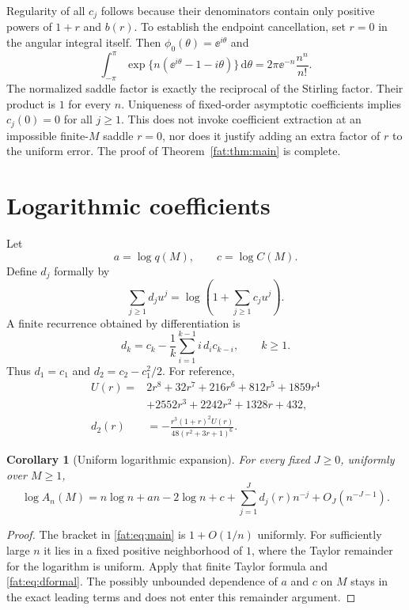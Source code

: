 \documentclass[11pt,letterpaper]{article}
\numberwithin{equation}{section}
\newtheorem{corollary}[theorem]{Corollary}
\theoremstyle{remark}\newtheorem{remark}[theorem]{Remark}
\newcommand{\dd}{\,\mathrm d}\newcommand{\TV}{d_{\mathrm{TV}}}\newcommand{\Pois}{\operatorname{Pois}}
\begin{document}
Regularity of all $c_j$ follows because their denominators contain only positive powers of $1+r$ and $b(r)$. To establish the endpoint cancellation, set $r=0$ in the angular integral itself. Then $\phi_0(\theta)=\ee^{i\theta}$ and
\[
 \int_{-\pi}^{\pi}\exp\{n(\ee^{i\theta}-1-i\theta)\}\dd\theta
 =2\pi\ee^{-n}\frac{n^n}{n!}.
\]
The normalized saddle factor is exactly the reciprocal of the Stirling factor. Their product is $1$ for every $n$. Uniqueness of fixed-order asymptotic coefficients implies $c_j(0)=0$ for all $j\ge1$. This does not invoke coefficient extraction at an impossible finite-$M$ saddle $r=0$, nor does it justify adding an extra factor of $r$ to the uniform error. The proof of Theorem~\ref{fat:thm:main} is complete.

\section{Logarithmic coefficients}\label{fat:sec:log}
Let
\[
 a=\log q(M),\qquad c=\log C(M).
\]
Define $d_j$ formally by
\begin{equation}\label{fat:eq:dformal}
 \sum_{j\ge1}d_ju^j=\log\left(1+\sum_{j\ge1}c_ju^j\right).
\end{equation}
A finite recurrence obtained by differentiation is
\begin{equation}\label{fat:eq:drecursion}
 d_k=c_k-\frac1k\sum_{i=1}^{k-1}i\,d_i c_{k-i},\qquad k\ge1.
\end{equation}
Thus $d_1=c_1$ and $d_2=c_2-c_1^2/2$. For reference,
\begin{align*}
 U(r)={}&2r^8+32r^7+216r^6+812r^5+1859r^4\\
 &+2552r^3+2242r^2+1328r+432,\\
 d_2(r)&=-\frac{r^3(1+r)^2U(r)}{48(r^2+3r+1)^6}.
\end{align*}

\begin{corollary}[Uniform logarithmic expansion]\label{fat:cor:log}
For every fixed $J\ge0$, uniformly over $M\ge1$,
\begin{equation}\label{fat:eq:log}
 \log A_n(M)=n\log n+an-2\log n+c
 +\sum_{j=1}^{J}d_j(r)n^{-j}+O_J(n^{-J-1}).
\end{equation}
\end{corollary}
\begin{proof}
The bracket in \eqref{fat:eq:main} is $1+O(1/n)$ uniformly. For sufficiently large $n$ it lies in a fixed positive neighborhood of $1$, where the Taylor remainder for the logarithm is uniform. Apply that finite Taylor formula and \eqref{fat:eq:dformal}. The possibly unbounded dependence of $a$ and $c$ on $M$ stays in the exact leading terms and does not enter this remainder argument.
\end{proof}
\end{document}
